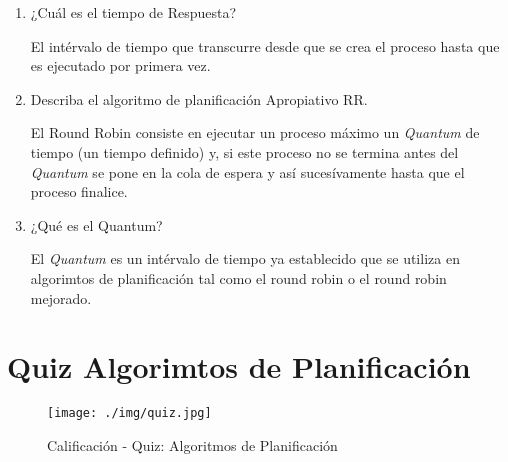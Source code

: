 \documentclass[12pt, a4paper]{article} %
\begin{document}
\begin{enumerate}
	\item ¿Cuál es el tiempo de Respuesta?
	
	El intérvalo de tiempo que transcurre desde que se crea el proceso hasta que es ejecutado por primera vez.

	\item Describa el algoritmo de planificación Apropiativo RR.
	
	El Round Robin consiste en ejecutar un proceso máximo un \textit{Quantum} de tiempo (un tiempo definido) y, si este proceso no se termina antes del \textit{Quantum} se pone en la cola de espera y así sucesívamente hasta que el proceso finalice.

	\item ¿Qué es el Quantum?
	
	El \textit{Quantum} es un intérvalo de tiempo ya establecido que se utiliza en algorimtos de planificación tal como el round robin o el round robin mejorado.
\end{enumerate}

\clearpage
\section{Quiz Algorimtos de Planificación}
\begin{figure}[h]
	\centering
	\texttt{[image: ./img/quiz.jpg]}
	\caption{Calificación - Quiz: Algoritmos de Planificación}
\end{figure}

\nocite{*} %

\clearpage


\end{document}
